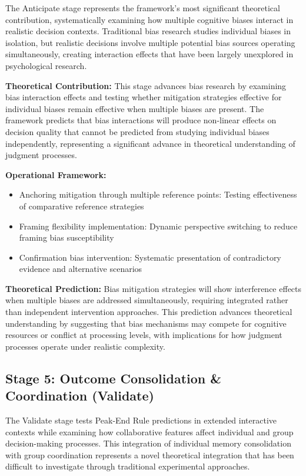 \documentclass[
  authoryear,
  preprint]{elsarticle}
\providecommand{\tightlist}{%
  \setlength{\itemsep}{0pt}\setlength{\parskip}{0pt}}
\begin{document}
The Anticipate stage represents the framework's most significant
theoretical contribution, systematically examining how multiple
cognitive biases interact in realistic decision contexts. Traditional
bias research studies individual biases in isolation, but realistic
decisions involve multiple potential bias sources operating
simultaneously, creating interaction effects that have been largely
unexplored in psychological research.

\textbf{Theoretical Contribution:} This stage advances bias research by
examining bias interaction effects and testing whether mitigation
strategies effective for individual biases remain effective when
multiple biases are present. The framework predicts that bias
interactions will produce non-linear effects on decision quality that
cannot be predicted from studying individual biases independently,
representing a significant advance in theoretical understanding of
judgment processes.

\textbf{Operational Framework:}

\begin{itemize}
\tightlist
\item
  Anchoring mitigation through multiple reference points: Testing
  effectiveness of comparative reference strategies
\item
  Framing flexibility implementation: Dynamic perspective switching to
  reduce framing bias susceptibility
\item
  Confirmation bias intervention: Systematic presentation of
  contradictory evidence and alternative scenarios
\end{itemize}

\textbf{Theoretical Prediction:} Bias mitigation strategies will show
interference effects when multiple biases are addressed simultaneously,
requiring integrated rather than independent intervention approaches.
This prediction advances theoretical understanding by suggesting that
bias mechanisms may compete for cognitive resources or conflict at
processing levels, with implications for how judgment processes operate
under realistic complexity.

\subsection{Stage 5: Outcome Consolidation \& Coordination
(Validate)}\label{stage-5-outcome-consolidation-coordination-validate}

The Validate stage tests Peak-End Rule predictions in extended
interactive contexts while examining how collaborative features affect
individual and group decision-making processes. This integration of
individual memory consolidation with group coordination represents a
novel theoretical integration that has been difficult to investigate
through traditional experimental approaches.
\end{document}
